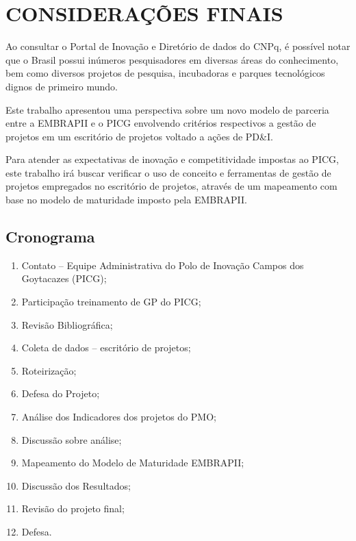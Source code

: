 \chapter{CONSIDERAÇÕES FINAIS}
\thispagestyle{empty}

Ao consultar o Portal de Inovação e Diretório de dados do CNPq, é possível notar que o Brasil possui inúmeros pesquisadores em diversas áreas do conhecimento, bem como diversos projetos de pesquisa, incubadoras e parques tecnológicos dignos de primeiro mundo.

Este trabalho apresentou uma perspectiva sobre um novo modelo de parceria entre a EMBRAPII e o PICG envolvendo critérios respectivos a gestão de projetos em um escritório de projetos voltado a ações de PD\&I.

Para atender as expectativas de inovação e competitividade impostas ao PICG, este trabalho irá buscar verificar o uso de conceito e ferramentas de gestão de projetos empregados no escritório de projetos, através de um mapeamento com base no modelo de maturidade imposto pela EMBRAPII.


\newpage
\thispagestyle{empty}
\singlespacing
\section{Cronograma}

  \begin{enumerate}
    \item{Contato – Equipe Administrativa do Polo de Inovação Campos dos Goytacazes (PICG);}
    \item{Participação treinamento de GP do PICG;}
    \item{Revisão Bibliográfica;}
    \item{Coleta de dados – escritório de projetos;}
    \item{Roteirização;}
    \item{Defesa do Projeto;}
    \item{Análise dos Indicadores dos projetos do PMO;}
    \item{Discussão sobre análise;}
    \item{Mapeamento do Modelo de Maturidade EMBRAPII;}
    \item{Discussão dos Resultados;}
    \item{Revisão do projeto final;}
    \item{Defesa.}
  \end{enumerate}

